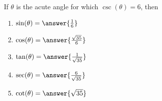 \documentclass{ximera}
\begin{document}
\begin{exercise}

  If $\theta$ is the acute angle for which $\csc(\theta)= 6$, then 

	\begin{enumerate}
		\item $\sin(\theta) = \answer{\frac{1}{6}}$
		\item $\cos(\theta) = \answer{\frac{\sqrt{35}}{6}}$
		\item $\tan(\theta) = \answer{\frac{1}{\sqrt{35}}}$
		\item $\sec(\theta) = \answer{\frac{6}{\sqrt{35}}}$
		\item $\cot(\theta) = \answer{\sqrt{35}}$
	\end{enumerate}

\end{exercise}
\end{document}
